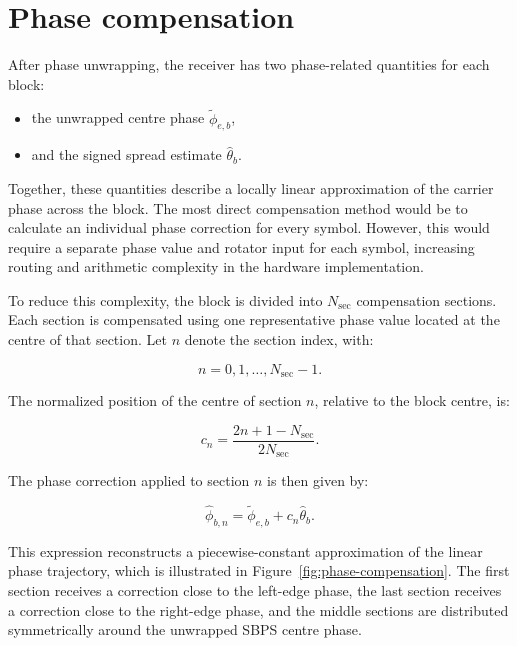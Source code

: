 \section{Phase compensation}

After phase unwrapping, the receiver has two phase-related quantities for each block:
\begin{itemize}
    \item the unwrapped centre phase $\tilde{\phi}_{e,b}$,
    \item and the signed spread estimate $\hat{\theta}_b$.
\end{itemize}

Together, these quantities describe a locally linear approximation of the carrier phase across the block. The most direct compensation method would be to calculate an individual phase correction for every symbol. However, this would require a separate phase value and rotator input for each symbol, increasing routing and arithmetic complexity in the hardware implementation.

To reduce this complexity, the block is divided into $N_{\mathrm{sec}}$ compensation sections. Each section is compensated using one representative phase value located at the centre of that section. Let $n$ denote the section index, with:

\begin{equation}
n = 0,1,\dots,N_{\mathrm{sec}}-1.
\end{equation}

The normalized position of the centre of section $n$, relative to the block centre, is:

\begin{equation}
c_n =
\frac{2n+1-N_{\mathrm{sec}}}{2N_{\mathrm{sec}}}.
\label{eq:section-position}
\end{equation}

The phase correction applied to section $n$ is then given by:

\begin{equation}
\hat{\phi}_{b,n}
=
\tilde{\phi}_{e,b}
+
c_n\hat{\theta}_b.
\label{eq:section-phase}
\end{equation}

This expression reconstructs a piecewise-constant approximation of the linear phase trajectory, which is illustrated in Figure~\ref{fig:phase-compensation}. The first section receives a correction close to the left-edge phase, the last section receives a correction close to the right-edge phase, and the middle sections are distributed symmetrically around the unwrapped \ac{SBPS} centre phase.

